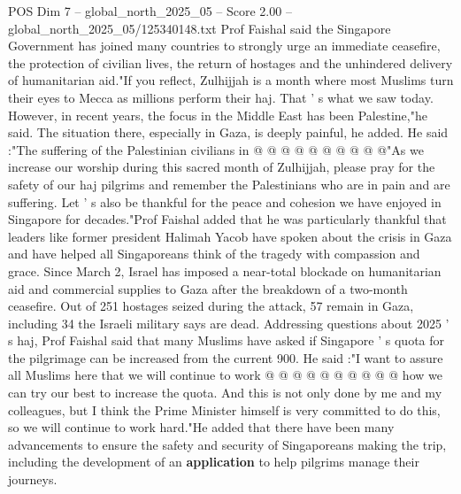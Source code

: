 \begin{textsample}{POS Dim 7 – global\_north\_2025\_05 – Score 2.00 – global\_north\_2025\_05/125340148.txt}
Prof Faishal said the Singapore Government has joined many countries to strongly urge an immediate ceasefire, the protection of civilian lives, the return of hostages and the unhindered delivery of humanitarian aid."If you reflect, Zulhijjah is a month where most Muslims turn their eyes to Mecca as millions perform their haj.
That ' s what we saw today.
However, in recent years, the focus in the Middle East has been Palestine,"he said.
The situation there, especially in Gaza, is deeply painful, he added.
He said :"The suffering of the Palestinian civilians in @ @ @ @ @ @ @ @ @ @"As we increase our worship during this sacred month of Zulhijjah, please pray for the safety of our haj pilgrims and remember the Palestinians who are in pain and are suffering.
Let ' s also be thankful for the peace and cohesion we have enjoyed in Singapore for decades."Prof Faishal added that he was particularly thankful that leaders like former president Halimah Yacob have spoken about the crisis in Gaza and have helped all Singaporeans think of the tragedy with compassion and grace.
Since March 2, Israel has imposed a near-total blockade on humanitarian aid and commercial supplies to Gaza after the breakdown of a two-month ceasefire.
Out of 251 hostages seized during the attack, 57 remain in Gaza, including 34 the Israeli military says are dead.
Addressing questions about 2025 ' s haj, Prof Faishal said that many Muslims have asked if Singapore ' s quota for the pilgrimage can be increased from the current 900.
He said :"I want to assure all Muslims here that we will continue to work @ @ @ @ @ @ @ @ @ @ how we can try our best to increase the quota.
And this is not only done by me and my colleagues, but I think the Prime Minister himself is very committed to do this, so we will continue to work hard."He added that there have been many advancements to ensure the safety and security of Singaporeans making the trip, including the development of an \textbf{application} to help pilgrims manage their journeys.

\end{textsample}
